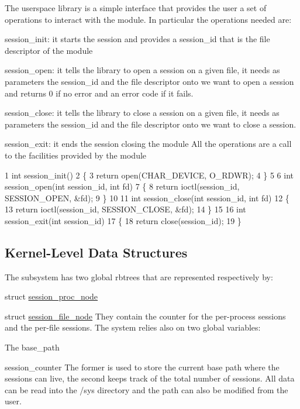 The userspace library is a simple interface that provides the user a set of operations to interact with the module. In particular the operations needed are\+:
\begin{DoxyItemize}
\item session\+\_\+init\+: it starts the session and provides a session\+\_\+id that is the file descriptor of the module
\item session\+\_\+open\+: it tells the library to open a session on a given file, it needs as parameters the session\+\_\+id and the file descriptor onto we want to open a session and returns 0 if no error and an error code if it fails.
\item session\+\_\+close\+: it tells the library to close a session on a given file, it needs as parameters the session\+\_\+id and the file descriptor onto we want to close a session.
\item session\+\_\+exit\+: it ends the session closing the module All the operations are a call to the facilities provided by the module 
\begin{DoxyCode}
1 int session\_init()
2 \{
3     return open(CHAR\_DEVICE, O\_RDWR);
4 \}
5 
6 int session\_open(int session\_id, int fd)
7 \{  
8     return ioctl(session\_id, SESSION\_OPEN, &fd);  
9 \}
10 
11 int session\_close(int session\_id, int fd)
12 \{   
13     return ioctl(session\_id, SESSION\_CLOSE, &fd); 
14 \}
15 
16 int session\_exit(int session\_id)
17 \{   
18         return close(session\_id);
19 \}
\end{DoxyCode}

\end{DoxyItemize}

\subsection*{Kernel-\/\+Level Data Structures}

The subsystem has two global rbtrees that are represented respectively by\+:
\begin{DoxyItemize}
\item struct \hyperlink{structsession__proc__node}{session\+\_\+proc\+\_\+node}
\item struct \hyperlink{structsession__file__node}{session\+\_\+file\+\_\+node} They contain the counter for the per-\/process sessions and the per-\/file sessions. The system relies also on two global variables\+:
\item The base\+\_\+path
\item session\+\_\+counter The former is used to store the current base path where the sessions can live, the second keeps track of the total number of sessions. All data can be read into the /sys directory and the path can also be modified from the user.
\end{DoxyItemize}

